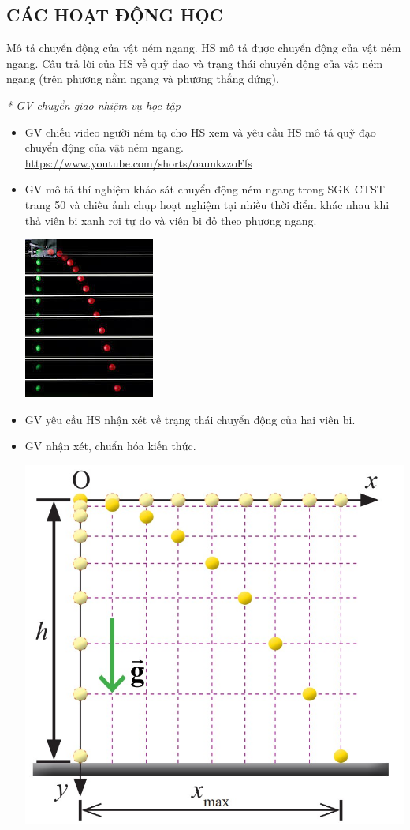 \subsection{CÁC HOẠT ĐỘNG HỌC}
\hoatdong
{Mô tả chuyển động của vật ném ngang.
}
{HS mô tả được chuyển động của vật ném ngang.
}
{Câu trả lời của HS về quỹ đạo và trạng thái chuyển động của vật ném ngang (trên phương nằm ngang và phương thẳng đứng).
}
{\textit{\underline{* GV chuyển giao nhiệm vụ học tập}}
	\begin{itemize}[label=-]
		\item GV chiếu video người ném tạ cho HS xem và yêu cầu HS mô tả quỹ đạo chuyển động của vật ném ngang.\\
		\url{https://www.youtube.com/shorts/oaunkzzoFfs}
		\item GV mô tả thí nghiệm khảo sát chuyển động ném ngang trong SGK CTST trang 50 và chiếu ảnh chụp hoạt nghiệm tại nhiều thời điểm khác nhau khi thả viên bi xanh rơi tự do và viên bi đỏ theo phương ngang.
		\begin{center}
			\includegraphics[scale=0.8]{figs/G10-BAI12-1}
		\end{center}
		\item GV yêu cầu HS nhận xét về trạng thái chuyển động của hai viên bi.
		\item GV nhận xét, chuẩn hóa kiến thức.
		\begin{center}
			\includegraphics[scale=0.6]{figs/G10-BAI12-2}

\end{center}
\end{itemize}}
